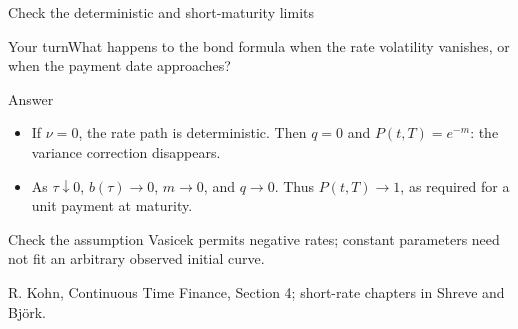 \documentclass[handout,10pt,t,aspectratio=169]{beamer}
\newenvironment{pausebox}{\begin{block}{Your turn}}{\end{block}}
\newenvironment{answerbox}{\begin{exampleblock}{Answer}}{\end{exampleblock}}
\newenvironment{watchbox}{\begin{alertblock}{Check the assumption}}{\end{alertblock}}
\newcommand{\source}[1]{\vfill{\scriptsize\color{gray}#1\par}}
\begin{document}
\begin{frame}{Check the deterministic and short-maturity limits}
\small
\begin{pausebox}What happens to the bond formula when the rate volatility
vanishes, or when the payment date approaches?\end{pausebox}
\begin{answerbox}
\begin{itemize}
\item If \(\nu=0\), the rate path is deterministic. Then \(q=0\)
and \(P(t,T)=e^{-m}\): the variance correction disappears.
\item As \(\tau\downarrow0\), \(b(\tau)\to0\), \(m\to0\), and \(q\to0\).
Thus \(P(t,T)\to1\), as required for a unit payment at maturity.
\end{itemize}
\end{answerbox}
\begin{watchbox}
Vasicek permits negative rates; constant parameters need not fit an arbitrary observed initial curve.\end{watchbox}
\source{R. Kohn, Continuous Time Finance, Section 4; short-rate chapters in Shreve and Bj\"ork.}
\end{frame}
\end{document}
